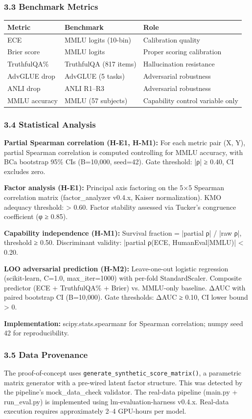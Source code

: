 \subsubsection{3.3 Benchmark Metrics}

\begin{table}[htbp]
\centering
\begin{tabular}{lll}
\toprule
Metric & Benchmark & Role \\
\midrule
ECE & MMLU logits (10-bin) & Calibration quality \\
Brier score & MMLU logits & Proper scoring calibration \\
TruthfulQA\% & TruthfulQA (817 items) & Hallucination resistance \\
AdvGLUE drop & AdvGLUE (5 tasks) & Adversarial robustness \\
ANLI drop & ANLI R1–R3 & Adversarial robustness \\
MMLU accuracy & MMLU (57 subjects) & Capability control variable only \\
\bottomrule
\end{tabular}
\end{table}

\subsubsection{3.4 Statistical Analysis}

\textbf{Partial Spearman correlation (H-E1, H-M1):} For each metric pair (X, Y), partial Spearman correlation is computed controlling for MMLU accuracy, with BCa bootstrap 95\% CIs (B=10,000, seed=42). Gate threshold: |ρ| ≥ 0.40, CI excludes zero.

\textbf{Factor analysis (H-E1):} Principal axis factoring on the 5×5 Spearman correlation matrix (factor_analyzer v0.4.x, Kaiser normalization). KMO adequacy threshold: > 0.60. Factor stability assessed via Tucker's congruence coefficient (φ ≥ 0.85).

\textbf{Capability independence (H-M1):} Survival fraction = |partial ρ| / |raw ρ|, threshold ≥ 0.50. Discriminant validity: |partial ρ(ECE, HumanEval|MMLU)| < 0.20.

\textbf{LOO adversarial prediction (H-M2):} Leave-one-out logistic regression (scikit-learn, C=1.0, max_iter=1000) with per-fold StandardScaler. Composite predictor (ECE + TruthfulQA\% + Brier) vs. MMLU-only baseline. ΔAUC with paired bootstrap CI (B=10,000). Gate thresholds: ΔAUC ≥ 0.10, CI lower bound > 0.

\textbf{Implementation:} scipy.stats.spearmanr for Spearman correlation; numpy seed 42 for reproducibility.

\subsubsection{3.5 Data Provenance}

The proof-of-concept uses \texttt{generate_synthetic_score_matrix()}, a parametric matrix generator with a pre-wired latent factor structure. This was detected by the pipeline's mock_data_check validator. The real-data pipeline (main.py + run_eval.py) is implemented using lm-evaluation-harness v0.4.x. Real-data execution requires approximately 2–4 GPU-hours per model.

